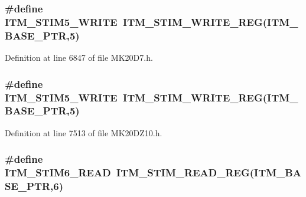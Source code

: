 \subsubsection[{\texorpdfstring{I\+T\+M\+\_\+\+S\+T\+I\+M5\+\_\+\+W\+R\+I\+TE}{ITM_STIM5_WRITE}}]{\setlength{\rightskip}{0pt plus 5cm}\#define I\+T\+M\+\_\+\+S\+T\+I\+M5\+\_\+\+W\+R\+I\+TE~{\bf I\+T\+M\+\_\+\+S\+T\+I\+M\+\_\+\+W\+R\+I\+T\+E\+\_\+\+R\+EG}({\bf I\+T\+M\+\_\+\+B\+A\+S\+E\+\_\+\+P\+TR},5)}\hypertarget{group___i_t_m___register___accessor___macros_ga07b231bcf27e2a69fe3168aa387fc4b7}{}\label{group___i_t_m___register___accessor___macros_ga07b231bcf27e2a69fe3168aa387fc4b7}


Definition at line 6847 of file M\+K20\+D7.\+h.

\subsubsection[{\texorpdfstring{I\+T\+M\+\_\+\+S\+T\+I\+M5\+\_\+\+W\+R\+I\+TE}{ITM_STIM5_WRITE}}]{\setlength{\rightskip}{0pt plus 5cm}\#define I\+T\+M\+\_\+\+S\+T\+I\+M5\+\_\+\+W\+R\+I\+TE~{\bf I\+T\+M\+\_\+\+S\+T\+I\+M\+\_\+\+W\+R\+I\+T\+E\+\_\+\+R\+EG}({\bf I\+T\+M\+\_\+\+B\+A\+S\+E\+\_\+\+P\+TR},5)}\hypertarget{group___i_t_m___register___accessor___macros_ga07b231bcf27e2a69fe3168aa387fc4b7}{}\label{group___i_t_m___register___accessor___macros_ga07b231bcf27e2a69fe3168aa387fc4b7}


Definition at line 7513 of file M\+K20\+D\+Z10.\+h.

\subsubsection[{\texorpdfstring{I\+T\+M\+\_\+\+S\+T\+I\+M6\+\_\+\+R\+E\+AD}{ITM_STIM6_READ}}]{\setlength{\rightskip}{0pt plus 5cm}\#define I\+T\+M\+\_\+\+S\+T\+I\+M6\+\_\+\+R\+E\+AD~{\bf I\+T\+M\+\_\+\+S\+T\+I\+M\+\_\+\+R\+E\+A\+D\+\_\+\+R\+EG}({\bf I\+T\+M\+\_\+\+B\+A\+S\+E\+\_\+\+P\+TR},6)}\hypertarget{group___i_t_m___register___accessor___macros_ga8a39db72396c8cd021762dbe2def218c}{}\label{group___i_t_m___register___accessor___macros_ga8a39db72396c8cd021762dbe2def218c}


